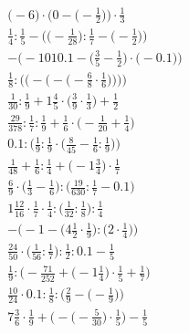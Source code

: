 \documentclass[8pt]{article}
\begin{document}
\begin{align}
\Big(-6\Big) \cdot \Big(0 - \big(-\frac{1}{2}\big)\Big) \cdot \frac{1}{3} \\
\frac{1}{4} : \frac{1}{5} - \Big(\big(-\frac{1}{28}\big) : \frac{1}{7} - \big(-\frac{1}{2}\big)\Big) \\
-\Big(-1010.1 - \big(\frac{3}{5} - \frac{1}{2}\big) \cdot \big(-0.1\big)\Big) \\
\frac{1}{8} : \Bigg(\bigg(-\Big(-\big(-\frac{6}{8} \cdot \frac{1}{6}\big)\Big)\bigg)\Bigg) \\
\frac{1}{30} : \frac{1}{9} + 1\frac{4}{5} \cdot \big(\frac{3}{9} \cdot \frac{1}{3}\big) + \frac{1}{2} \\
\frac{29}{378} : \frac{1}{7} : \frac{1}{9} + \frac{1}{6} \cdot \big(-\frac{1}{20} + \frac{1}{4}\big) \\
0.1 : \Big(\frac{1}{9} : \frac{1}{9} \cdot \big(\frac{8}{45} - \frac{1}{6} : \frac{1}{9}\big)\Big) \\
\frac{1}{48} + \frac{1}{6} : \frac{1}{4} + \big(-1\frac{3}{4}\big) \cdot \frac{1}{7} \\
\frac{6}{9} \cdot \big(\frac{1}{3} - \frac{1}{6}\big) : \big(\frac{19}{630} : \frac{1}{7} - 0.1\big) \\
1\frac{12}{16} \cdot \frac{1}{7} \cdot \frac{1}{4} : \big(\frac{1}{32} : \frac{1}{8}\big) : \frac{1}{4} \\
-\Big(-1 - \big(4\frac{1}{2} \cdot \frac{1}{9}\big) : \big(2 \cdot \frac{1}{4}\big)\Big) \\
\frac{24}{50} \cdot \big(\frac{1}{56} : \frac{1}{7}\big) : \frac{1}{2} : 0.1 - \frac{1}{5} \\
\frac{1}{9} : \Big(-\frac{71}{252} + \big(-1\frac{1}{4}\big) \cdot \frac{1}{5} + \frac{1}{7}\Big) \\
\frac{10}{24} \cdot 0.1 : \frac{1}{8} : \Big(\frac{2}{9} - \big(-\frac{1}{9}\big)\Big) \\
7\frac{3}{6} \cdot \frac{1}{9} + \Big(-\big(-\frac{5}{30}\big) \cdot \frac{1}{5}\Big) - \frac{1}{5}
\end{align}
\end{document}
